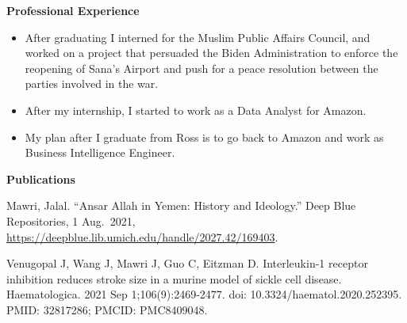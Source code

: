 \documentclass[
]{book}
\providecommand{\tightlist}{%
  \setlength{\itemsep}{0pt}\setlength{\parskip}{0pt}}
\begin{document}
\textbf{Professional Experience}

\begin{itemize}
\tightlist
\item
  After graduating I interned for the Muslim Public Affairs Council, and worked on a project that persuaded the Biden Administration to enforce the reopening of Sana's Airport and push for a peace resolution between the parties involved in the war.
\item
  After my internship, I started to work as a Data Analyst for Amazon.
\item
  My plan after I graduate from Ross is to go back to Amazon and work as Business Intelligence Engineer.
\end{itemize}

\textbf{Publications}

Mawri, Jalal. ``Ansar Allah in Yemen: History and Ideology.'' Deep Blue Repositories, 1 Aug.~2021, \url{https://deepblue.lib.umich.edu/handle/2027.42/169403}.

Venugopal J, Wang J, Mawri J, Guo C, Eitzman D. Interleukin-1 receptor inhibition reduces stroke size in a murine model of sickle cell disease. Haematologica. 2021 Sep 1;106(9):2469-2477. doi: 10.3324/haematol.2020.252395. PMID: 32817286; PMCID: PMC8409048.

  
\end{document}
